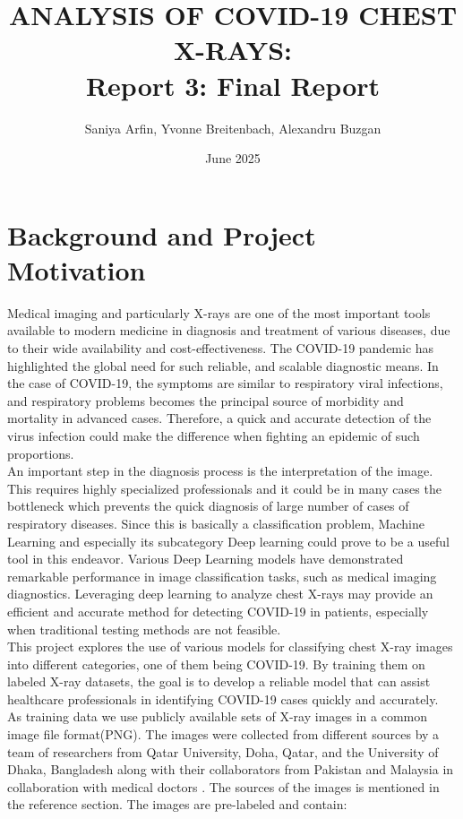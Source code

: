 \documentclass{article}
\title{ANALYSIS OF COVID-19 CHEST X-RAYS: \\Report 3: Final Report}
\author{Saniya Arfin, Yvonne Breitenbach, Alexandru Buzgan}
\date{June 2025}
\begin{document}
\maketitle

\tableofcontents

\newpage 

\section{Background and Project Motivation}
Medical imaging and particularly X-rays are one of the most important tools available to modern medicine in diagnosis and treatment of various diseases, due to their wide availability and cost-effectiveness.  The COVID-19 pandemic has highlighted the global need for such reliable, and scalable diagnostic means. In the case of COVID-19, the symptoms are similar to respiratory viral infections, and respiratory problems becomes the principal source of morbidity and mortality in advanced cases. Therefore, a quick and accurate detection of the virus infection could make the difference when fighting an epidemic of such proportions.\\
An important step in the diagnosis process is the interpretation of the image. This requires highly specialized professionals and it could be in many cases the bottleneck which prevents the quick diagnosis of large number of cases of respiratory diseases. Since this is basically a classification problem, Machine Learning and especially its subcategory Deep learning could prove to be a useful tool in this endeavor. Various Deep Learning models have demonstrated remarkable performance in image classification tasks, such as medical imaging diagnostics. Leveraging deep learning to analyze chest X-rays may provide an efficient and accurate method for detecting COVID-19 in patients, especially when traditional testing methods are not feasible.\\
This project explores the use of various models for classifying chest X-ray images into different categories, one of them being COVID-19. By training them on labeled X-ray datasets, the goal is to develop a reliable model that can assist healthcare professionals in identifying COVID-19 cases quickly and accurately.\\
As training data we use publicly available sets of X-ray images in a common image file format(PNG). The images were collected from different sources by a team of researchers from Qatar University, Doha, Qatar, and the University of Dhaka, Bangladesh along with their collaborators from Pakistan and Malaysia in collaboration with medical doctors \cite{chowdhury2020} \cite{rahman2020}. The sources of the images is mentioned in the reference section. The images are pre-labeled and contain:
\end{document}
